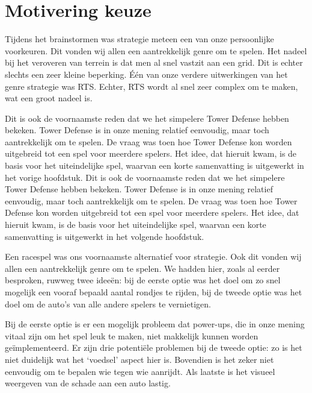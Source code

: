 \section{Motivering keuze}
Tijdens het brainstormen was strategie meteen een van onze persoonlijke voorkeuren. Dit vonden wij allen een aantrekkelijk genre om te spelen. Het nadeel bij het veroveren van terrein is dat men al snel vastzit aan een grid. Dit is echter slechts een zeer kleine beperking. \'E\'en van onze verdere uitwerkingen van het genre strategie was RTS. Echter, RTS wordt al snel zeer complex om te maken, wat een groot nadeel is.

Dit is ook de voornaamste reden dat we het simpelere Tower Defense hebben bekeken. Tower Defense is in onze mening relatief eenvoudig, maar toch aantrekkelijk om te spelen. De vraag was toen hoe Tower Defense kon worden uitgebreid tot een spel voor meerdere spelers. Het idee, dat hieruit kwam, is de basis voor het uiteindelijke spel, waarvan een korte samenvatting is uitgewerkt in het vorige hoofdstuk.
Dit is ook de voornaamste reden dat we het simpelere Tower Defense hebben bekeken. Tower Defense is in onze mening relatief eenvoudig, maar toch aantrekkelijk om te spelen. De vraag was toen hoe Tower Defense kon worden uitgebreid tot een spel voor meerdere spelers. Het idee, dat hieruit kwam, is de basis voor het uiteindelijke spel, waarvan een korte samenvatting is uitgewerkt in het volgende hoofdstuk.

Een racespel was ons voornaamste alternatief voor strategie. Ook dit vonden wij allen een aantrekkelijk genre om te spelen. We hadden hier, zoals al eerder besproken, ruwweg twee idee\"en: bij de eerste optie was het doel om zo snel mogelijk een vooraf bepaald aantal rondjes te rijden, bij de tweede optie was het doel om de auto's van alle andere spelers te vernietigen.

Bij de eerste optie is er een mogelijk probleem dat power-ups, die in onze mening vitaal zijn om het spel leuk te maken, niet makkelijk kunnen worden ge\"implementeerd. Er zijn drie potenti\"ele problemen bij de tweede optie: zo is het niet duidelijk wat het `voedsel' aspect hier is. Bovendien is het zeker niet eenvoudig om te bepalen wie tegen wie aanrijdt. Als laatste is het visueel weergeven van de schade aan een auto lastig.

